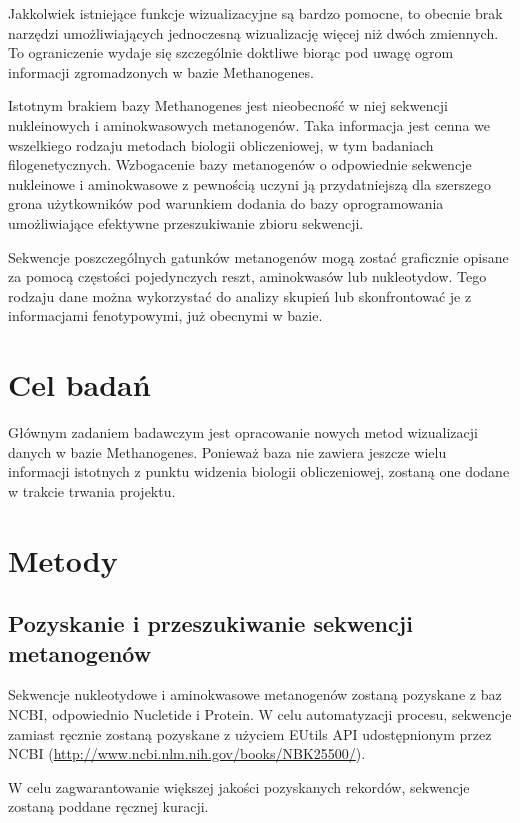\documentclass{article}
\begin{document}
Jakkolwiek istniejące funkcje wizualizacyjne są bardzo pomocne, to obecnie brak 
narzędzi umożliwiających jednoczesną wizualizację więcej niż dwóch zmiennych. 
To ograniczenie wydaje się szczególnie doktliwe biorąc pod uwagę ogrom 
informacji zgromadzonych w bazie Methanogenes. 

Istotnym brakiem bazy Methanogenes jest nieobecność w niej sekwencji 
nukleinowych i aminokwasowych metanogenów. Taka informacja jest cenna we 
wszelkiego rodzaju metodach biologii obliczeniowej, w tym 
badaniach filogenetycznych. Wzbogacenie bazy metanogenów o odpowiednie 
sekwencje nukleinowe i aminokwasowe z pewnością uczyni ją przydatniejszą dla 
szerszego grona użytkowników pod warunkiem dodania do bazy oprogramowania 
umożliwiające efektywne przeszukiwanie zbioru sekwencji.

Sekwencje poszczególnych gatunków metanogenów mogą zostać graficznie opisane za 
pomocą częstości pojedynczych reszt, aminokwasów lub nukleotydow. Tego rodzaju 
dane można wykorzystać do analizy skupień lub skonfrontować je z informacjami 
fenotypowymi, już obecnymi w bazie.

\section{Cel badań}

Głównym zadaniem badawczym jest opracowanie nowych metod wizualizacji danych w 
bazie Methanogenes. Ponieważ baza nie zawiera jeszcze wielu informacji 
istotnych z punktu widzenia biologii obliczeniowej, zostaną one dodane w 
trakcie trwania projektu.

\section{Metody}

\subsection{Pozyskanie i przeszukiwanie sekwencji metanogenów}

Sekwencje nukleotydowe i aminokwasowe metanogenów zostaną pozyskane z baz NCBI, 
odpowiednio Nucletide i Protein. W celu automatyzacji procesu, sekwencje 
zamiast ręcznie zostaną pozyskane z użyciem EUtils API udostępnionym przez NCBI 
(\url{http://www.ncbi.nlm.nih.gov/books/NBK25500/}).

W celu zagwarantowanie większej jakości pozyskanych rekordów, sekwencje zostaną 
poddane ręcznej kuracji. 
\end{document}
